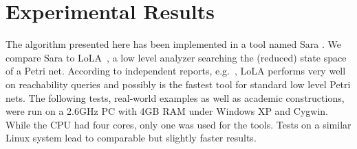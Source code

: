 \documentclass{LMCS}
\begin{document}
\section{Experimental Results}\label{sec8}

The algorithm presented here has been implemented in a tool named Sara \cite{sara}. We compare Sara
to LoLA~\cite{Wolf_2007_icatpn}, a low level analyzer searching the (reduced) state space of a Petri net. According to
independent reports, e.g.~\cite{talcottdill}, LoLA performs very well on reachability queries
and possibly is the fastest tool for standard low level Petri nets.
The following tests, real-world examples as well as academic constructions, were run on a 2.6GHz PC 
with 4GB RAM under Windows XP and Cygwin. While the CPU had four cores, only one was used for the tools.
Tests on a similar Linux system lead to comparable but slightly faster results.
\end{document}
